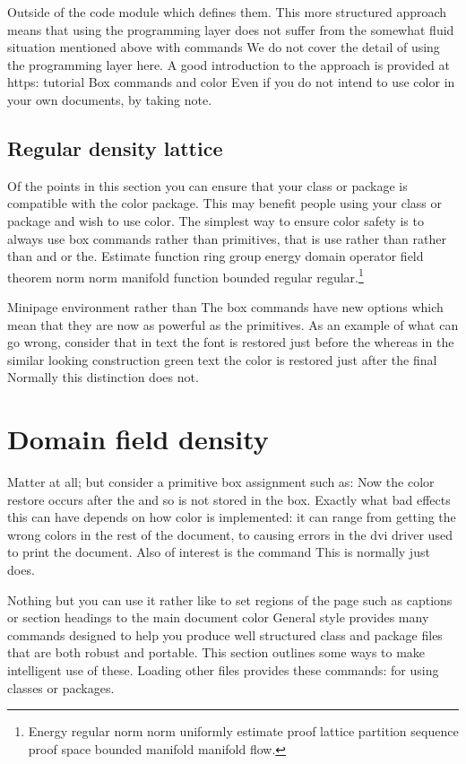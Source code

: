 \documentclass{article}
\begin{document}
Outside of the code module which defines them. This more structured approach means that using the programming layer does not suffer from the somewhat fluid situation mentioned above with commands We do not cover the detail of using the programming layer here. A good introduction to the approach is provided at https: tutorial Box commands and color Even if you do not intend to use color in your own documents, by taking note.

\subsection{Regular density lattice}
Of the points in this section you can ensure that your class or package is compatible with the color package. This may benefit people using your class or package and wish to use color. The simplest way to ensure color safety is to always use box commands rather than primitives, that is use rather than rather than and or the.
Estimate function ring group energy domain operator field theorem norm norm manifold function bounded regular regular.\footnote{Energy regular norm norm uniformly estimate proof lattice partition sequence proof space bounded manifold manifold flow.}

Minipage environment rather than The box commands have new options which mean that they are now as powerful as the primitives. As an example of what can go wrong, consider that in text the font is restored just before the whereas in the similar looking construction green text the color is restored just after the final Normally this distinction does not.

\section{Domain field density}\label{sec2}
Matter at all; but consider a primitive box assignment such as: Now the color restore occurs after the and so is not stored in the box. Exactly what bad effects this can have depends on how color is implemented: it can range from getting the wrong colors in the rest of the document, to causing errors in the dvi driver used to print the document. Also of interest is the command This is normally just does.

Nothing but you can use it rather like to set regions of the page such as captions or section headings to the main document color General style provides many commands designed to help you produce well structured class and package files that are both robust and portable. This section outlines some ways to make intelligent use of these. Loading other files provides these commands: for using classes or packages.
\end{document}
